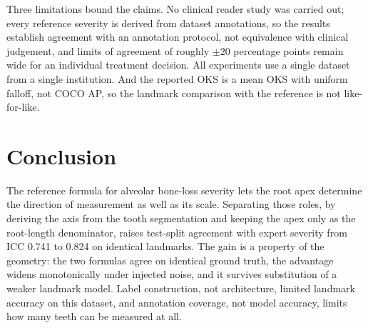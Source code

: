 \documentclass[conference]{IEEEtran}
\begin{document}
Three limitations bound the claims. No clinical reader study was carried out; every reference severity is derived from dataset annotations, so the results establish agreement with an annotation protocol, not equivalence with clinical judgement, and limits of agreement of roughly $\pm 20$ percentage points remain wide for an individual treatment decision. All experiments use a single dataset from a single institution. And the reported OKS is a mean OKS with uniform falloff, not COCO AP, so the landmark comparison with the reference is not like-for-like.

\section{Conclusion}
\label{sec:conclusion}

The reference formula for alveolar bone-loss severity lets the root apex determine the direction of measurement as well as its scale. Separating those roles, by deriving the axis from the tooth segmentation and keeping the apex only as the root-length denominator, raises test-split agreement with expert severity from ICC 0.741 to 0.824 on identical landmarks. The gain is a property of the geometry: the two formulas agree on identical ground truth, the advantage widens monotonically under injected noise, and it survives substitution of a weaker landmark model. Label construction, not architecture, limited landmark accuracy on this dataset, and annotation coverage, not model accuracy, limits how many teeth can be measured at all.



\end{document}
